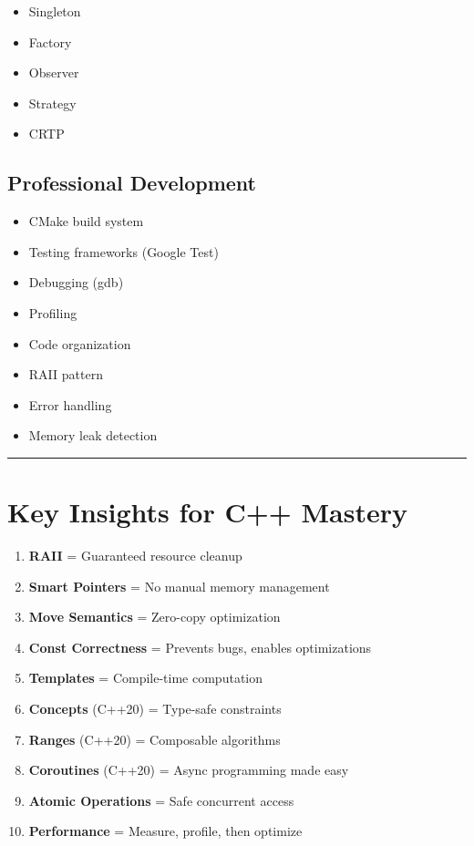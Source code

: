 \begin{itemize}
\tightlist
\item
  Singleton
\item
  Factory
\item
  Observer
\item
  Strategy
\item
  CRTP
\end{itemize}

\hypertarget{professional-development}{%
\subsection{Professional Development}\label{professional-development}}

\begin{itemize}
\tightlist
\item
  CMake build system
\item
  Testing frameworks (Google Test)
\item
  Debugging (gdb)
\item
  Profiling
\item
  Code organization
\item
  RAII pattern
\item
  Error handling
\item
  Memory leak detection
\end{itemize}

\begin{center}\rule{0.5\linewidth}{0.5pt}\end{center}

\hypertarget{key-insights-for-c-mastery}{%
\section{Key Insights for C++
Mastery}\label{key-insights-for-c-mastery}}

\begin{enumerate}
\def\labelenumi{\arabic{enumi}.}
\tightlist
\item
  \textbf{RAII} = Guaranteed resource cleanup
\item
  \textbf{Smart Pointers} = No manual memory management
\item
  \textbf{Move Semantics} = Zero-copy optimization
\item
  \textbf{Const Correctness} = Prevents bugs, enables optimizations
\item
  \textbf{Templates} = Compile-time computation
\item
  \textbf{Concepts} (C++20) = Type-safe constraints
\item
  \textbf{Ranges} (C++20) = Composable algorithms
\item
  \textbf{Coroutines} (C++20) = Async programming made easy
\item
  \textbf{Atomic Operations} = Safe concurrent access
\item
  \textbf{Performance} = Measure, profile, then optimize
\end{enumerate}

